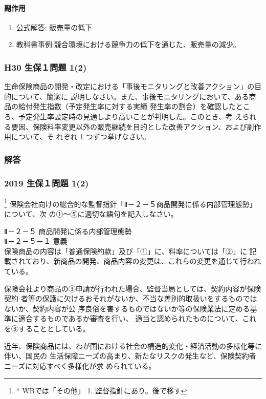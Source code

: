 \documentclass[report,gutter=10mm,fore-edge=10mm,uplatex,dvipdfmx]{jlreq}
\begin{document}
\paragraph{副作用}
\begin{enumerate}
 \item 公式解答: 販売量の低下
 \item 教科書事例:競合環境における競争力の低下を通じた、販売量の減少。
\end{enumerate}

\subsubsection{H30 生保１問題 1(2)}
生命保険商品の開発・改定における「事後モニタリングと改善アクション」の目的について、簡潔に
説明しなさい。また、事後モニタリングにおいて、ある商品の給付発生指数（予定発生率に対する実績
発生率の割合）を確認したところ、予定発生率設定時の見通しより高いことが判明した。このとき、考
えられる要因、保険料率変更以外の販売継続を目的とした改善アクション、および副作用について、そ
れぞれ 1 つずつ挙げなさい。
\subsubsection{解答}

\subsubsection{2019 生保１問題 1(2)}
\footnote{* WBでは「その他」 1. 監督指針にあり。後で移す}
保険会社向けの総合的な監督指針「Ⅱ－２－５商品開発に係る内部管理態勢」について、次
の①～⑤に適切な語句を記入しなさい。

Ⅱ－２－５ 商品開発に係る内部管理態勢\\
Ⅱ－２－５－１ 意義\\
保険商品の内容は「普通保険約款」及び「①」に、料率については「②」に
記載されており、新商品の開発、商品内容の変更は、これらの変更を通じて行われている。

保険会社より商品の③申請が行われた場合、監督当局としては、契約内容が保険契約
者等の保護に欠けるおそれがないか、不当な差別的取扱いをするものではないか、契約内容が公
序良俗を害するものではないか等の保険業法に定める基準に適合するものであるか審査を行い、
適当と認められたものについて、これを③することとしている。

近年、保険商品には、わが国における社会の構造的変化・経済活動の多様化等に伴い、国民の
生活保障ニーズの高まり、新たなリスクの発生など、保険契約者ニーズに対応すべく多様化が求
められている。
\end{document}
